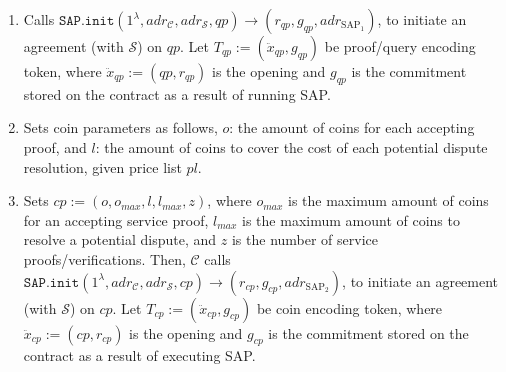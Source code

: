 \begin{enumerate}
\begin{enumerate}
\item  Calls $\mathtt{SAP.init}(1^{\scriptscriptstyle\lambda}, adr_{\scriptscriptstyle\mathcal{C}}, adr_{\scriptscriptstyle\mathcal{S}},qp )\rightarrow(r_{\scriptscriptstyle qp}, g_{\scriptscriptstyle qp}, adr_{\scriptscriptstyle\text{SAP}_{\scriptscriptstyle 1}})$, to initiate an agreement (with $\mathcal{S}$) on $qp$.  Let $T_{\scriptscriptstyle qp}:=(\ddot{x}_{\scriptscriptstyle qp}, g_{\scriptscriptstyle qp})$ be proof/query encoding token,  where  $\ddot{x}_{\scriptscriptstyle qp}:=(qp,r_{\scriptscriptstyle qp})$ is the opening and $g_{\scriptscriptstyle qp}$ is the commitment stored on the contract as a result of running   SAP. 


\item   Sets coin parameters as   follows,   $o$: the amount of coins for each accepting proof, and $l$: the amount of coins  to cover the cost of each potential dispute resolution, given  price list $pl$.  %




\item  Sets  $cp:=(o,o_{\scriptscriptstyle max},l,l_{\scriptscriptstyle max},z)$, where $o_{\scriptscriptstyle max}$ is the maximum amount of coins  for an accepting service proof,  $l_{\scriptscriptstyle max}$  is the maximum amount of coins to resolve a potential dispute, and $z$ is the number of  service proofs/verifications. Then, $\mathcal C$ calls $\mathtt{SAP.init}(1^{\scriptscriptstyle\lambda}, adr_{\scriptscriptstyle\mathcal{C}}, adr_{\scriptscriptstyle\mathcal{S}},cp )\rightarrow(r_{\scriptscriptstyle cp},g_{\scriptscriptstyle cp},adr_{\scriptscriptstyle\text{SAP}_{\scriptscriptstyle 2}})$, to initiate an agreement (with $\mathcal{S}$) on $cp$. Let $T_{\scriptscriptstyle cp}:=(\ddot{x}_{\scriptscriptstyle cp},g_{\scriptscriptstyle cp})$ be coin encoding token,  where  $\ddot{x}_{\scriptscriptstyle cp}:=(cp,r_{\scriptscriptstyle cp})$ is the opening and $g_{\scriptscriptstyle cp}$ is the commitment stored on the contract as a result of executing   SAP.  






\end{enumerate}
\end{enumerate}

